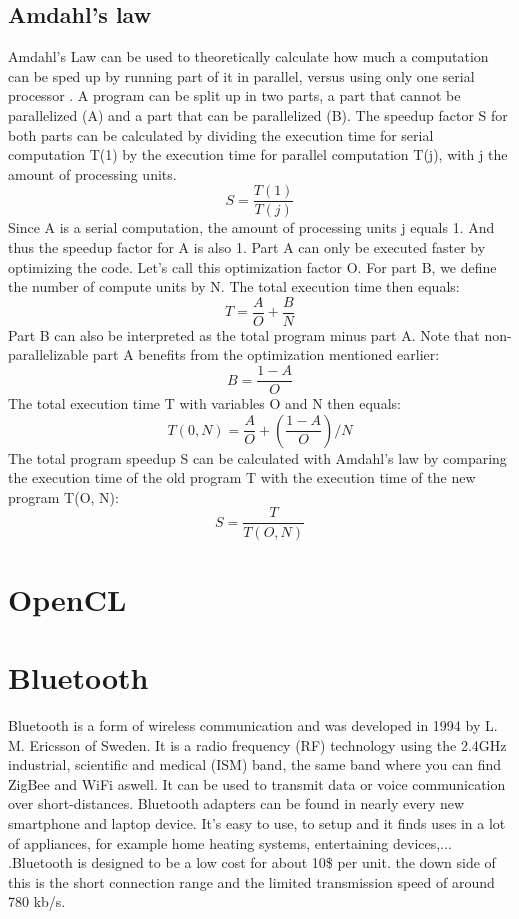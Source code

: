 \documentclass[a4paper, 11pt]{report}
\begin{document}
	\subsection{Amdahl's law}
Amdahl's Law can be used to theoretically calculate how much a computation can be sped up by running part of it in parallel, versus using only one serial processor \cite{amdahlslaw}. A program can be split up in two parts, a part that cannot be parallelized (A) and a part that can be parallelized (B). The speedup factor S for both parts can be calculated by dividing the execution time for serial computation T(1) by the execution time for parallel computation T(j), with j the amount of processing units.
\begin{equation}
	S = \frac{T(1)}{T(j)}
\end{equation}
Since A is a serial computation, the amount of processing units j equals 1. And thus the speedup factor for A is also 1. Part A can only be executed faster by optimizing the code. Let's call this optimization factor O. For part B, we define the number of compute units by N. The total execution time then equals:
\begin{equation}
	T = \frac{A}{O} + \frac{B}{N}	
\end{equation}
Part B can also be interpreted as the total program minus part A. Note that non-parallelizable part A benefits from the optimization mentioned earlier:
\begin{equation}
	B = \frac{1-A}{O}
\end{equation}
The total execution time T with variables O and N then equals:
\begin{equation}
	T(0, N) = \frac{A}{O} + (\frac{1-A}{O})/N
\end{equation}
The total program speedup S can be calculated with Amdahl's law by comparing the execution time of the old program T with the execution time of the new program T(O, N):
\begin{equation}
	S  = \frac{T}{T(O, N)}
\end{equation}


	\section{OpenCL}\label{subsec:OpenCL}
	
	\section{Bluetooth}
Bluetooth is a form of wireless communication and was developed in 1994 by L. M. Ericsson of Sweden. It is a radio frequency (RF) technology using the 2.4GHz industrial, scientific and medical (ISM) band, the same band where you can find ZigBee and WiFi aswell. It can be used to transmit data or voice communication over short-distances. Bluetooth adapters can be found in nearly every new smartphone and laptop device. It's easy to use, to setup and it finds uses in a lot of appliances, for example home heating systems, entertaining devices,... .Bluetooth is designed to be a low cost for about 10\$ per unit. the down side of this is the short connection range and the limited transmission speed of around 780 kb/s\cite{bluetoothTech}.\\
\end{document}
